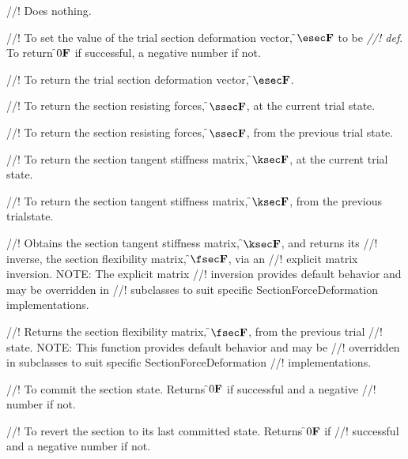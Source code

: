 //! Does nothing.

//! To set the value of the trial section deformation vector, \f$\esec\f$ to be {\em
//! def}. To return \f$0{\bf F}$ if successful, a negative number if not.

//! To return the trial section deformation vector, \f$\esec\f$.

//! To return the section resisting forces, \f$\ssec\f$, at the current trial state.

//! To return the section resisting forces, \f$\ssec\f$, from the previous trial state.

//! To return the section tangent stiffness matrix, \f$\ksec\f$, at the current trial state.

//! To return the section tangent stiffness matrix, \f$\ksec\f$, from the previous trialstate.

//! Obtains the section tangent stiffness matrix, \f$\ksec\f$, and returns its
//! inverse, the section flexibility matrix, \f$\fsec\f$, via an
//! explicit matrix inversion.  NOTE: The explicit matrix
//! inversion provides default behavior and may be overridden in
//! subclasses to suit specific SectionForceDeformation implementations.

//! Returns the section flexibility matrix, \f$\fsec\f$, from the previous trial
//! state. NOTE: This function provides default behavior and may be
//! overridden in subclasses to suit specific SectionForceDeformation
//! implementations.

//! To commit the section state.  Returns \f$0{\bf F}$ if successful and a negative
//! number if not.

//! To revert the section to its last committed state.  Returns \f$0{\bf F}$ if
//! successful and a negative number if not.

